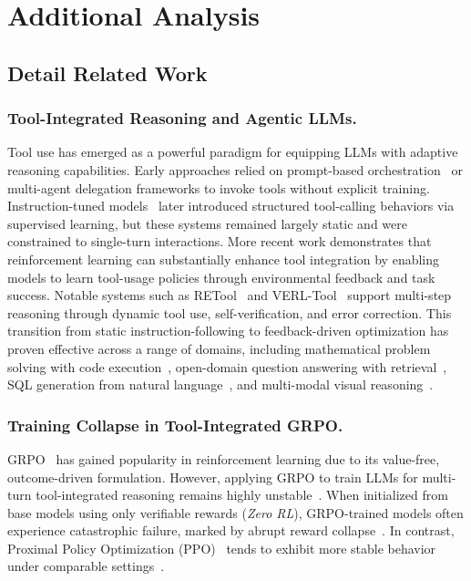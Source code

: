 \section{Additional Analysis}
\subsection{Detail Related Work}\label{sec:d_rela}
\subsubsection{Tool-Integrated Reasoning and Agentic LLMs.}
Tool use has emerged as a powerful paradigm for equipping LLMs with adaptive reasoning capabilities. Early approaches relied on prompt-based orchestration~\citep{lu2023chameleon,shen2023hugginggpt} or multi-agent delegation frameworks to invoke tools without explicit training. Instruction-tuned models~\citep{gou2023tora,qin2023toolllm} later introduced structured tool-calling behaviors via supervised learning, but these systems remained largely static and were constrained to single-turn interactions. More recent work demonstrates that reinforcement learning can substantially enhance tool integration by enabling models to learn tool-usage policies through environmental feedback and task success. Notable systems such as RETool~\citep{feng2025retool} and VERL-Tool~\citep{jiang2025verltool} support multi-step reasoning through dynamic tool use, self-verification, and error correction. This transition from static instruction-following to feedback-driven optimization has proven effective across a range of domains, including mathematical problem solving with code execution~\citep{xue2025simpletir}, open-domain question answering with retrieval~\citep{jin2025search}, SQL generation from natural language~\citep{jiang2025verltool}, and multi-modal visual reasoning~\citep{gao2024multi}.  

\subsubsection{Training Collapse in Tool-Integrated GRPO.}
GRPO~\citep{guo2025deepseek} has gained popularity in reinforcement learning due to its value-free, outcome-driven formulation. However, applying GRPO to train LLMs for multi-turn tool-integrated reasoning remains highly unstable~\citep{jin2025search}. When initialized from base models using only verifiable rewards (\textit{Zero RL}), GRPO-trained models often experience catastrophic failure, marked by abrupt reward collapse~\citep{xue2025simpletir,jin2025search}. In contrast, Proximal Policy Optimization (PPO)~\citep{schulman2017proximal} tends to exhibit more stable behavior under comparable settings~\citep{jin2025search}. 

